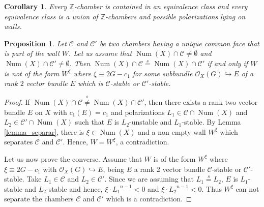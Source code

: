 \documentclass[11pt,twoside]{amsart}
\newtheorem{proposition}[theorem]{Proposition}
\newtheorem{corollary}[theorem]{Corollary}
\theoremstyle{definition}
\newcommand{\Num}{\operatorname{Num}}
\begin{document}
\begin{corollary}
    Every $\mathbb{Z}$-chamber is contained in an equivalence class and every equivalence class is a union of $\mathbb{Z}$-chambers and possible polarizations lying on walls.

\end{corollary}

\begin{proposition}
\label{prop_camarasequiv}
    Let $\mathcal{C}$ and $\mathcal{C'}$ be two chambers having a unique common face that is part of the wall $W$. 
    Let us assume that $\Num(X)\cap \mathcal{C}\neq\emptyset$ and $\Num(X)\cap \mathcal{C'}\neq\emptyset$.
    Then $\Num(X)\cap \mathcal{C}\overset{s}{=}\Num(X)\cap \mathcal{C'}$ if and only if $W$ is not of the form $W^{\xi}$ where $\xi\equiv 2G-c_1$ for some subbundle 
 $\mathcal{O}_X(G)\hookrightarrow E$ of a rank $2$ vector bundle $E$ which is $\mathcal{C}$-stable or $\mathcal{C}'$-stable.
    
\end{proposition}
\begin{proof}
    
  If $\Num(X)\cap \mathcal{C}\overset{s}{\neq}\Num(X)\cap \mathcal{C'}$, then there exists a rank two vector bundle $E$ on $X$ with $c_1(E)=c_1$ and polarizations  $L_1\in\mathcal{C}\cap\Num(X)$ and $L_2\in\mathcal{C'}\cap\Num(X)$ such that $E$ is $L_2$-unstable and $L_1$-stable.
By Lemma \ref{lemma_separar}, there is $\xi\in\Num(X)$ and a non empty wall $W^{\xi}$ which separates $\mathcal{C}$ and $\mathcal{C}'$. Hence, $W=W^{\xi}$, a contradiction.

    Let us now prove the converse.
    Assume that $W$ is of the form $W^{\xi}$ where $\xi\equiv 2G-c_1$ with $\mathcal{O}_X(G)\hookrightarrow E$, being $E$ a rank 2 vector bundle $\mathcal{C}$-stable or $\mathcal{C}'$-stable. Take $L_1\in\mathcal{C}$ and $L_2\in\mathcal{C}'$. Since  we are assuming that $L_1\overset{s}{=}L_2$, $E$ is $L_1$-stable and $L_2$-stable and hence,  $\xi\cdot {L_1}^{n-1}<0$ and $\xi\cdot {L_2}^{n-1}<0$. Thus $W^{\xi}$ can not separate the chambers $\mathcal{C}$ and $\mathcal{C}'$ which is a contradiction.
\end{proof}
\end{document}
